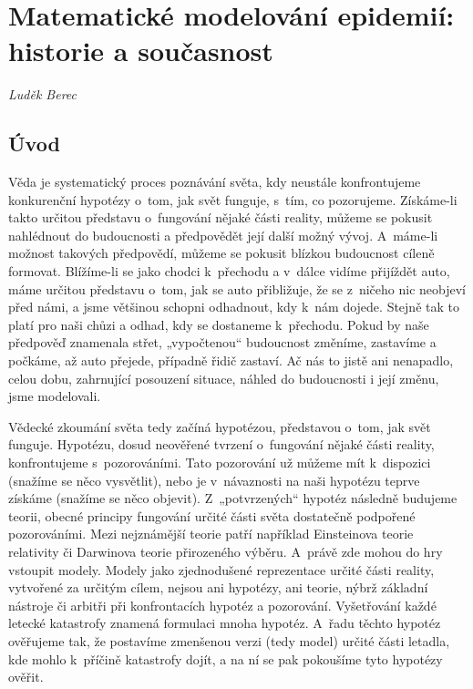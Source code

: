 \chapter[Matematické modelování epidemií]{Matematické modelování epidemií: historie a současnost}
\label{Typy_modelu}

\textit{Luděk Berec}
\vspace{15mm}

\section*{Úvod}

Věda je systematický proces poznávání světa, kdy neustále konfrontujeme konkurenční hypotézy o~tom, jak svět funguje, s~tím, co pozorujeme. Získáme-li takto určitou představu o~fungování nějaké části reality, můžeme se pokusit nahlédnout do budoucnosti a předpovědět její další možný vývoj. A~máme-li možnost takových předpovědí, můžeme se pokusit blízkou budoucnost cíleně formovat. Blížíme-li se jako chodci k~přechodu a v~dálce vidíme přijíždět auto, máme určitou představu o~tom, jak se auto přibližuje, že se z~ničeho nic neobjeví před námi, a jsme většinou schopni odhadnout, kdy k~nám dojede. Stejně tak to platí pro naši chůzi a odhad, kdy se dostaneme k~přechodu. Pokud by naše předpověď znamenala střet, „vypočtenou“ budoucnost změníme, zastavíme a počkáme, až auto přejede, případně řidič zastaví. Ač nás to jistě ani nenapadlo, celou dobu, zahrnující posouzení situace, náhled do budoucnosti i její změnu, jsme modelovali.

Vědecké zkoumání světa tedy začíná hypotézou, představou o~tom, jak svět funguje. Hypotézu, dosud neověřené tvrzení o~fungování nějaké části reality, konfrontujeme s~pozorováními. Tato pozorování už můžeme mít k~dispozici (snažíme se něco vysvětlit), nebo je v~návaznosti na naši hypotézu teprve získáme (snažíme se něco objevit). Z~„potvrzených“ hypotéz následně budujeme teorii, obecné principy fungování určité části světa dostatečně podpořené pozorováními. Mezi nejznámější teorie patří například Einsteinova teorie relativity či Darwinova teorie přirozeného výběru. A~právě zde mohou do hry vstoupit modely. Modely jako zjednodušené reprezentace určité části reality, vytvořené za určitým cílem, nejsou ani hypotézy, ani teorie, nýbrž základní nástroje či arbitři při konfrontacích hypotéz a pozorování. Vyšetřování každé letecké katastrofy znamená formulaci mnoha hypotéz. A~řadu těchto hypotéz ověřujeme tak, že postavíme zmenšenou verzi (tedy model) určité části letadla, kde mohlo k~příčině katastrofy dojít, a na ní se pak pokoušíme tyto hypotézy ověřit.

